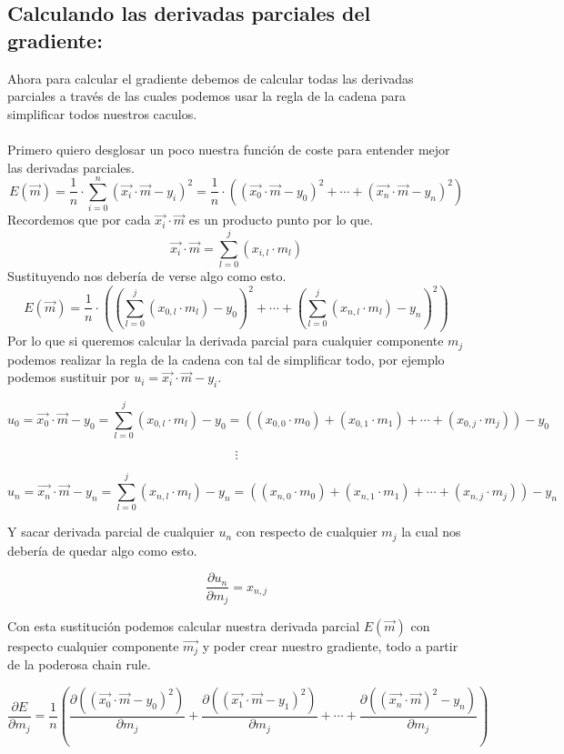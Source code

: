 \documentclass[12pt, letterpaper]{article}
\begin{document}
\subsection{Calculando las derivadas parciales del gradiente:}
Ahora para calcular el gradiente debemos de calcular todas las derivadas parciales a través de las cuales
podemos usar la regla de la cadena para simplificar todos nuestros caculos.\\\\
Primero quiero desglosar un poco nuestra función de coste para entender mejor las derivadas parciales.
\[
  E(\vec{m}) = \frac{1}{n} \cdot \sum_{i = 0}^{n}(\vec{x_i} \cdot \vec{m} - y_i)^2 =
  \frac{1}{n} \cdot ((\vec{x_0} \cdot \vec{m} - y_0)^2 + \cdots + ( \vec{x_n} \cdot \vec{m} - y_n)^2)
\]
Recordemos que por cada $\vec{x_i} \cdot \vec{m}$ es un producto punto por lo que.
\[
  \vec{x_i} \cdot \vec{m}  = \sum_{l = 0}^{j} (x_{i, l} \cdot m_l)
\]
Sustituyendo nos debería de verse algo como esto.
\[
  E(\vec{m})
  = \frac{1}{n} \cdot ((\sum_{l = 0}^{j} (x_{0, l} \cdot m_l) - y_0)^2 +
  \cdots + (\sum_{l = 0}^{j} (x_{n, l} \cdot m_l) - y_n)^2)
\]
Por lo que si queremos calcular la derivada parcial para cualquier componente $m_j$ podemos realizar
la regla de la cadena con tal de simplificar todo, por ejemplo podemos sustituir por
$u_i = \vec{x_i} \cdot \vec{m} - y_i$.

\[
  u_0 = \vec{x_0} \cdot \vec{m} - y_0 = \sum_{l = 0}^j(x_{0,l} \cdot m_l) - y_0 =  ((x_{0, 0} \cdot m_0)
  + (x_{0, 1} \cdot m_1) + \cdots + (x_{0, j} \cdot m_j)) - y_0
\]

\[
  \vdots
\]

\[
  u_n = \vec{x_n} \cdot \vec{m} - y_n =  \sum_{l = 0}^j(x_{n,l} \cdot m_l) - y_n = ((x_{n, 0} \cdot m_0)
  + (x_{n, 1} \cdot m_1) + \cdots + (x_{n, j} \cdot m_j)) - y_n
\]

Y sacar derivada parcial de cualquier $u_n$ con respecto de cualquier $m_j$
la cual nos debería de quedar algo como esto. 

\[
  \frac{\partial u_n}{\partial m_j} = x_{n, j}
\]

Con esta sustitución podemos calcular nuestra derivada parcial $E(\vec{m})$ con
respecto cualquier componente $\vec{m_j}$ y poder
crear nuestro gradiente, todo a partir de la poderosa chain rule.

\[
  \frac{\partial E}{\partial m_j}
  = \frac{1}{n}(\frac{\partial ((\vec{x_0} \cdot \vec{m} - y_0)^2)}{\partial m_j} +
  \frac{\partial ((\vec{x_1} \cdot \vec{m} - y_1)^2)}{\partial m_j}
  + \cdots
   + \frac{\partial ((\vec{x_n} \cdot \vec{m})^2 - y_n)}{\partial m_j})
 \]
\end{document}
